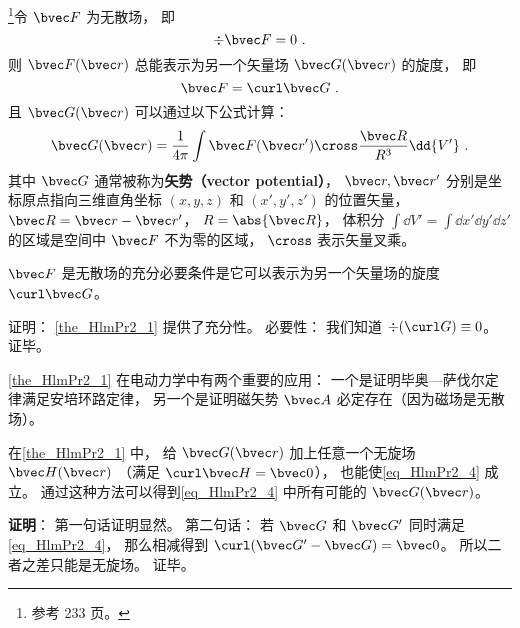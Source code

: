 
\begin{issues}
\issueTODO
\end{issues}


\begin{theorem}{}\label{the_HlmPr2_1}
\footnote{参考 \cite{GriffE} 233 页。}令 $\bvec F$ 为无散场， 即
\begin{equation}
\div \bvec F = 0~.
\end{equation}
则 $\bvec F(\bvec r)$ 总能表示为另一个矢量场 $\bvec G(\bvec r)$ 的旋度， 即
\begin{equation}\label{eq_HlmPr2_4}
\bvec F = \curl \bvec G~.
\end{equation}
且 $\bvec G(\bvec r)$ 可以通过以下公式计算：
\begin{equation}\label{eq_HlmPr2_1}
\bvec G(\bvec r) = \frac{1}{4\pi}\int \bvec F(\bvec r') \cross \frac{\bvec R}{R^3} \dd{V'}~.
\end{equation}
其中 $\bvec G$ 通常被称为\textbf{矢势（vector potential）}， $\bvec r, \bvec r'$ 分别是坐标原点指向三维直角坐标 $(x, y, z)$ 和 $(x', y', z')$ 的位置矢量， $\bvec R = \bvec r - \bvec r'$， $R = \abs{\bvec R}$， 体积分 $\int\dd{V'} = \int\dd{x'}\dd{y'}\dd{z'}$ 的区域是空间中 $\bvec F$ 不为零的区域， $\cross$ 表示矢量叉乘。
\end{theorem}

\begin{corollary}{}
$\bvec F$ 是无散场的充分必要条件是它可以表示为另一个矢量场的旋度 $\curl \bvec G$。
\end{corollary}
证明： \autoref{the_HlmPr2_1} 提供了充分性。 必要性： 我们知道 $\div (\curl G) \equiv 0$。%
证毕。

\autoref{the_HlmPr2_1} 在电动力学中有两个重要的应用： 一个是证明毕奥—萨伐尔定律满足安培环路定律， 另一个是证明磁矢势 $\bvec A$ 必定存在（因为磁场是无散场）。

\begin{corollary}{}\label{cor_HlmPr2_1}
在\autoref{the_HlmPr2_1} 中， 给 $\bvec G(\bvec r)$ 加上任意一个无旋场 $\bvec H(\bvec r)$ （满足 $\curl \bvec H = \bvec 0$）， 也能使\autoref{eq_HlmPr2_4} 成立。 通过这种方法可以得到\autoref{eq_HlmPr2_4} 中所有可能的 $\bvec G(\bvec r)$。
\end{corollary}
\textbf{证明}： 第一句话证明显然。 第二句话： 若 $\bvec G$ 和 $\bvec G'$ 同时满足\autoref{eq_HlmPr2_4}， 那么相减得到 $\curl (\bvec G' - \bvec G) = \bvec 0$。 所以二者之差只能是无旋场。 证毕。

